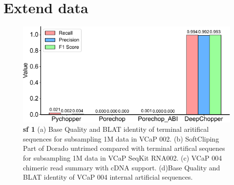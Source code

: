 \documentclass[pdflatex, sn-mathphys-num, lineno]{sn-jnl}%
\theoremstyle{thmstyleone}%
\theoremstyle{thmstyletwo}%
\theoremstyle{thmstylethree}%
\begin{document}




\newpage

\section{Extend data}

\renewcommand{\figurename}{Extended Data Fig.}



 \begin{figure}[!h]
     \includegraphics[height=0.65\columnwidth]{figures/finals/sf1}
     \caption{ {\bf  sf 1 } (a) Base Quality and BLAT identity of terminal aritifical sequences for subsampling 1M data in VCaP 002. (b) SoftCliping Part of Dorado untrimed compared with terminal artifical sequenes for subsampling 1M data in VCaP SeqKit RNA002. (c) VCaP 004 chimeric read summary with cDNA support. (d)Base Quality and BLAT identity of VCaP 004 internal artificial sequences.}
     \label{fig:sf1}
 \end{figure}
\end{document}
